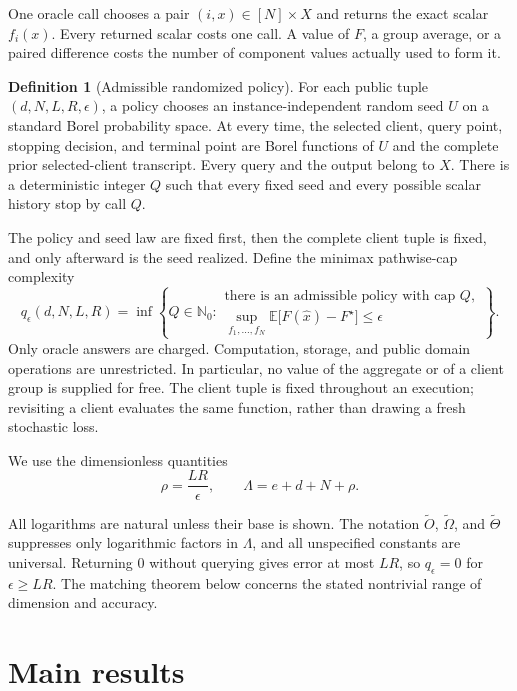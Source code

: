 \documentclass[11pt]{article}
\numberwithin{equation}{section}
\theoremstyle{remark}
\theoremstyle{definition}
\newtheorem{definition}[definition]{Definition}
\newcommand{\E}{\mathbb{E}}
\newcommand{\eps}{\epsilon}
\begin{document}
One oracle call chooses a pair $(i,x)\in[N]\times X$ and returns the exact scalar $f_i(x)$.  Every returned scalar costs one call.  A value of $F$, a group average, or a paired difference costs the number of component values actually used to form it.

\begin{definition}[Admissible randomized policy]
For each public tuple $(d,N,L,R,\eps)$, a policy chooses an instance-independent random seed $U$ on a standard Borel probability space.  At every time, the selected client, query point, stopping decision, and terminal point are Borel functions of $U$ and the complete prior selected-client transcript.  Every query and the output belong to $X$.  There is a deterministic integer $Q$ such that every fixed seed and every possible scalar history stop by call $Q$.
\end{definition}

The policy and seed law are fixed first, then the complete client tuple is fixed, and only afterward is the seed realized.  Define the minimax pathwise-cap complexity
\[
q_\eps(d,N,L,R)
=
\inf\left\{Q\in\mathbb N_0:
\begin{array}{l}
\text{there is an admissible policy with cap }Q,\\[1mm]
\displaystyle
\sup_{f_1,\ldots,f_N}
\E\bigl[F(\widehat x)-F^\star\bigr]\le\eps
\end{array}
\right\}.
\]
Only oracle answers are charged. Computation, storage, and public
domain operations are unrestricted. In particular, no value of the
aggregate or of a client group is supplied for free. The client tuple
is fixed throughout an execution; revisiting a client evaluates the
same function, rather than drawing a fresh stochastic loss.

We use the dimensionless quantities
\[
\rho=\frac{LR}{\eps},
\qquad
\Lambda=e+d+N+\rho.
\]


All logarithms are natural unless their base is shown. The notation
$\widetilde O$, $\widetilde\Omega$, and $\widetilde\Theta$ suppresses
only logarithmic factors in $\Lambda$, and all unspecified constants
are universal. Returning $0$ without querying gives error at most
$LR$, so $q_\eps=0$ for $\eps\ge LR$. The matching theorem below
concerns the stated nontrivial range of dimension and accuracy.

\section{Main results}
\label{sec:main}
\end{document}
